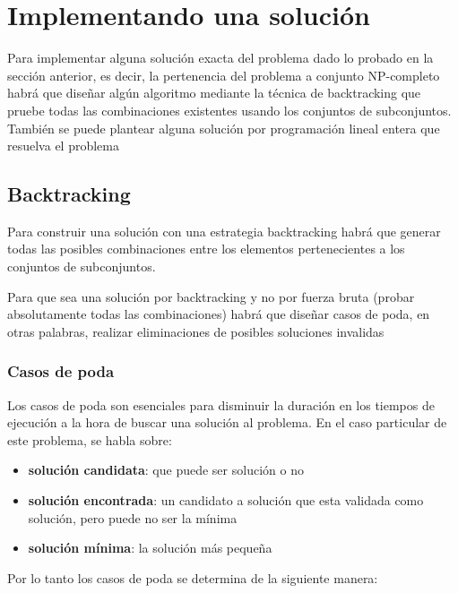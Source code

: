\section{Implementando una solución}

Para implementar alguna solución exacta del problema dado lo probado en la sección anterior, es decir, la pertenencia del problema a conjunto NP-completo habrá que diseñar algún algoritmo mediante la técnica de backtracking que pruebe todas las combinaciones existentes usando los conjuntos de subconjuntos. También se puede plantear alguna solución por programación lineal entera que resuelva el problema

\subsection{Backtracking}

Para construir una solución con una estrategia backtracking habrá que generar todas las posibles combinaciones entre los elementos pertenecientes a los conjuntos de subconjuntos. 

Para que sea una solución por backtracking y no por fuerza bruta (probar absolutamente todas las combinaciones) habrá que diseñar casos de poda, en otras palabras, realizar eliminaciones de posibles soluciones invalidas 

\subsubsection{Casos de poda}

Los casos de poda son esenciales para disminuir la duración en los tiempos de ejecución a la hora de buscar una solución al problema. En el caso particular de este problema, se habla sobre: 

\begin{itemize}
    \item \textbf{solución candidata}: que puede ser solución o no \\
    \item \textbf{solución encontrada}: un candidato a solución que esta validada como solución, pero puede no ser la mínima \\
    \item \textbf{solución mínima}: la solución más pequeña \\
\end{itemize}

Por lo tanto los casos de poda se determina de la siguiente manera: 

